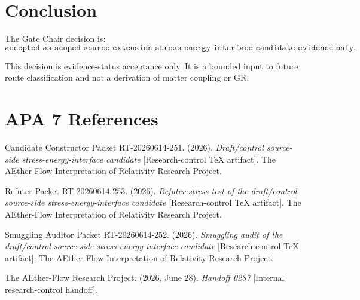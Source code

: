\documentclass[11pt]{article}
\begin{document}
\section{Conclusion}

The Gate Chair decision is:
\[
  \texttt{accepted\_as\_scoped\_source\_extension\_stress\_energy\_interface\_candidate\_evidence\_only}.
\]

This decision is evidence-status acceptance only. It is a bounded input to
future route classification and not a derivation of matter coupling or GR.

\section{APA 7 References}

Candidate Constructor Packet RT-20260614-251. (2026). \textit{Draft/control
source-side stress-energy-interface candidate} [Research-control TeX artifact].
The AEther-Flow Interpretation of Relativity Research Project.

Refuter Packet RT-20260614-253. (2026). \textit{Refuter stress test of the
draft/control source-side stress-energy-interface candidate} [Research-control
TeX artifact]. The AEther-Flow Interpretation of Relativity Research Project.

Smuggling Auditor Packet RT-20260614-252. (2026). \textit{Smuggling audit of
the draft/control source-side stress-energy-interface candidate}
[Research-control TeX artifact]. The AEther-Flow Interpretation of Relativity
Research Project.

The AEther-Flow Research Project. (2026, June 28). \textit{Handoff 0287}
[Internal research-control handoff].
\end{document}
